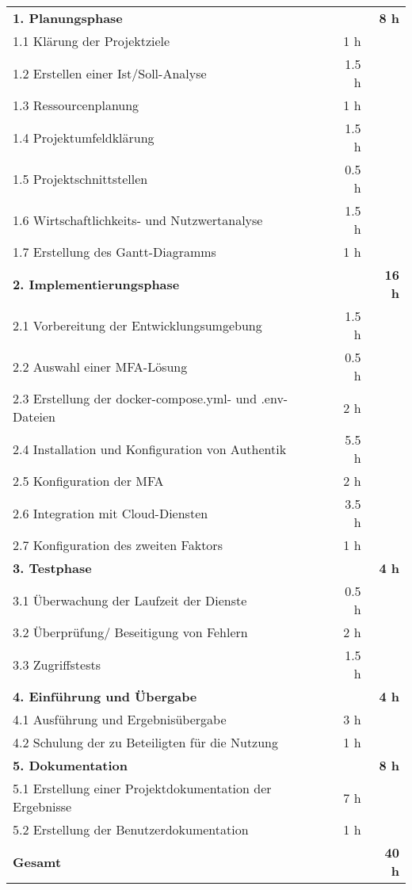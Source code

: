 \begin{tabularx}{\textwidth}{Xrrr}
\rowcolor{heading}\textbf{1. Planungsphase} & \textbf{} & \textbf{} & \textbf{8 h} \\
1.1 Klärung der Projektziele &       &   1 h   &  \\
\rowcolor{odd}1.2 Erstellen einer Ist/Soll-Analyse &       &    1.5 h   &  \\
1.3 Ressourcenplanung &       &    1 h    &  \\
\rowcolor{odd}1.4 Projektumfeldklärung &       &   1.5 h   &  \\
1.5 Projektschnittstellen &       &    0.5 h   &  \\
\rowcolor{odd}1.6 Wirtschaftlichkeits- und Nutzwertanalyse &       &    1.5 h   &  \\
1.7 Erstellung des Gantt-Diagramms &        &    1 h     &   \\
\rowcolor{heading}\textbf{2. Implementierungsphase} & \textbf{} & \textbf{} & \textbf{16 h} \\
2.1 Vorbereitung der Entwicklungsumgebung &       &    1.5 h   &  \\
\rowcolor{odd}2.2 Auswahl einer \acs{MFA}-Lösung  &       &    0.5 h   &  \\
2.3 Erstellung der docker-compose.yml- und .env-Dateien &       &   2 h    &  \\
\rowcolor{odd}2.4 Installation und Konfiguration von Authentik &      &   5.5 h    &  \\
2.5 Konfiguration der \acs{MFA} &       &   2 h   &  \\
\rowcolor{odd}2.6 Integration mit Cloud-Diensten &     &   3.5 h    &  \\
2.7 Konfiguration des zweiten Faktors &       &    1 h    &   \\
\rowcolor{heading}\textbf{3. Testphase} & \textbf{} & \textbf{} & \textbf{4 h} \\
3.1 Überwachung der Laufzeit der Dienste &       &    0.5 h    &  \\
\rowcolor{odd}3.2 Überprüfung/ Beseitigung von Fehlern &       &    2 h   &  \\
3.3 Zugriffstests &        &    1.5 h   &    \\
\rowcolor{heading}\textbf{4. Einführung und Übergabe} & \textbf{} & \textbf{} & \textbf{4 h} \\
4.1 Ausführung und Ergebnisübergabe &       &    3 h   &  \\
\rowcolor{odd}4.2 Schulung der zu Beteiligten für die Nutzung &      &   1 h   &    \\
\rowcolor{heading}\textbf{5. Dokumentation} & \textbf{} & \textbf{} & \textbf{8 h} \\
5.1 Erstellung einer Projektdokumentation der Ergebnisse &       &   7 h   &  \\
\rowcolor{odd}5.2 Erstellung der Benutzerdokumentation &       &    1 h   &    \\
\hline
\hline
\rowcolor{heading}\textbf{Gesamt} & \textbf{} & \textbf{} & \textbf{40 h} \\
\end{tabularx}
